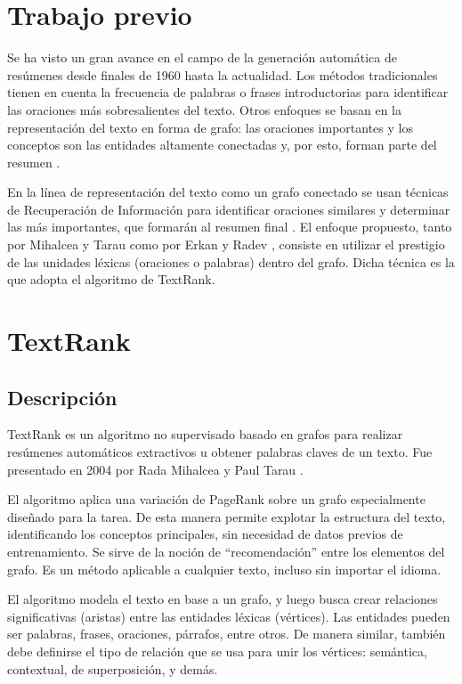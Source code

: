 \documentclass{llncs}
\begin{document}
\section{Trabajo previo}
Se ha visto un gran avance en el campo de la generación automática de resúmenes desde finales de 1960 hasta la actualidad. Los métodos tradicionales tienen en cuenta la frecuencia de palabras o frases introductorias para identificar las oraciones más sobresalientes del texto. Otros enfoques se basan en la representación del texto en forma de grafo: las oraciones importantes y los conceptos son las entidades altamente conectadas y, por esto, forman parte del resumen \cite{barzilay}. 

En la línea de representación del texto como un grafo conectado se usan técnicas de Recuperación de Información para identificar oraciones similares y determinar las más importantes, que formarán al resumen final \cite{salton}. El enfoque propuesto, tanto por Mihalcea y Tarau \cite{mihalcea-tarau} como por Erkan y Radev \cite{erkan}, consiste en utilizar el prestigio de las unidades léxicas (oraciones o palabras) dentro del grafo. Dicha técnica es la que adopta el algoritmo de TextRank.


\section{TextRank}

\subsection{Descripción}
TextRank es un algoritmo no supervisado basado en grafos para realizar resúmenes automáticos extractivos u obtener palabras claves de un texto. Fue presentado en 2004 por Rada Mihalcea y Paul Tarau \cite{mihalcea-tarau}.

El algoritmo aplica una variación de PageRank \cite{pageetal98} sobre un grafo especialmente diseñado para la tarea. De esta manera permite explotar la estructura del texto, identificando los conceptos principales, sin necesidad de datos previos de entrenamiento. Se sirve de la noción de “recomendación” entre los elementos del grafo. Es un método aplicable a cualquier texto, incluso sin importar el idioma.

El algoritmo modela el texto en base a un grafo, y luego busca crear relaciones significativas (aristas) entre las entidades léxicas (vértices). Las entidades pueden ser palabras, frases, oraciones, párrafos, entre otros. De manera similar, también debe definirse el tipo de relación que se usa para unir los vértices: semántica, contextual, de superposición, y demás.
\end{document}
